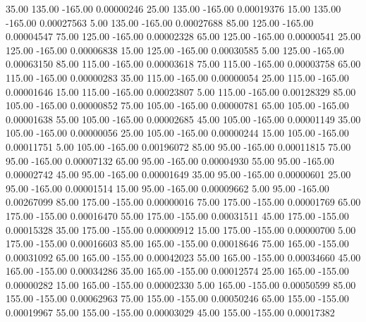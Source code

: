      35.00    135.00   -165.00     0.00000246
     25.00    135.00   -165.00     0.00019376
     15.00    135.00   -165.00     0.00027563
      5.00    135.00   -165.00     0.00027688
     85.00    125.00   -165.00     0.00004547
     75.00    125.00   -165.00     0.00002328
     65.00    125.00   -165.00     0.00000541
     25.00    125.00   -165.00     0.00006838
     15.00    125.00   -165.00     0.00030585
      5.00    125.00   -165.00     0.00063150
     85.00    115.00   -165.00     0.00003618
     75.00    115.00   -165.00     0.00003758
     65.00    115.00   -165.00     0.00000283
     35.00    115.00   -165.00     0.00000054
     25.00    115.00   -165.00     0.00001646
     15.00    115.00   -165.00     0.00023807
      5.00    115.00   -165.00     0.00128329
     85.00    105.00   -165.00     0.00000852
     75.00    105.00   -165.00     0.00000781
     65.00    105.00   -165.00     0.00001638
     55.00    105.00   -165.00     0.00002685
     45.00    105.00   -165.00     0.00001149
     35.00    105.00   -165.00     0.00000056
     25.00    105.00   -165.00     0.00000244
     15.00    105.00   -165.00     0.00011751
      5.00    105.00   -165.00     0.00196072
     85.00     95.00   -165.00     0.00011815
     75.00     95.00   -165.00     0.00007132
     65.00     95.00   -165.00     0.00004930
     55.00     95.00   -165.00     0.00002742
     45.00     95.00   -165.00     0.00001649
     35.00     95.00   -165.00     0.00000601
     25.00     95.00   -165.00     0.00001514
     15.00     95.00   -165.00     0.00009662
      5.00     95.00   -165.00     0.00267099
     85.00    175.00   -155.00     0.00000016
     75.00    175.00   -155.00     0.00001769
     65.00    175.00   -155.00     0.00016470
     55.00    175.00   -155.00     0.00031511
     45.00    175.00   -155.00     0.00015328
     35.00    175.00   -155.00     0.00000912
     15.00    175.00   -155.00     0.00000700
      5.00    175.00   -155.00     0.00016603
     85.00    165.00   -155.00     0.00018646
     75.00    165.00   -155.00     0.00031092
     65.00    165.00   -155.00     0.00042023
     55.00    165.00   -155.00     0.00034660
     45.00    165.00   -155.00     0.00034286
     35.00    165.00   -155.00     0.00012574
     25.00    165.00   -155.00     0.00000282
     15.00    165.00   -155.00     0.00002330
      5.00    165.00   -155.00     0.00050599
     85.00    155.00   -155.00     0.00062963
     75.00    155.00   -155.00     0.00050246
     65.00    155.00   -155.00     0.00019967
     55.00    155.00   -155.00     0.00003029
     45.00    155.00   -155.00     0.00017382
